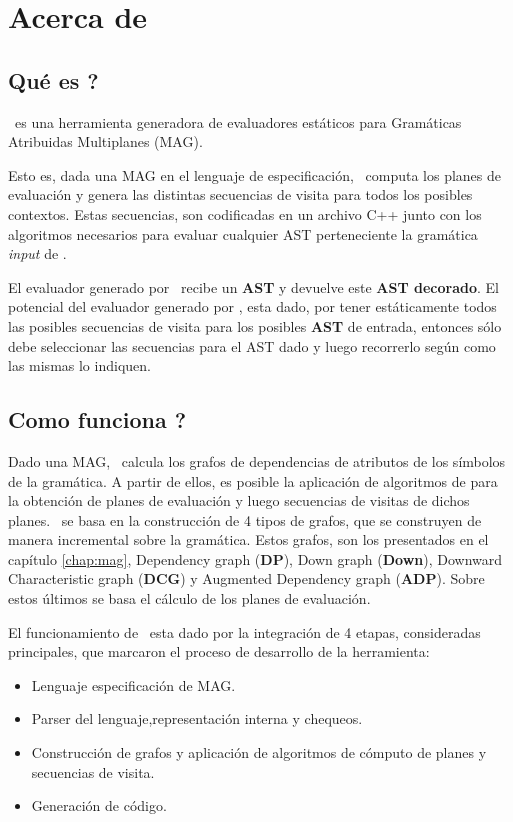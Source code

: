 \chapter{Acerca de \maggen}
\label{chap:acercamaggen}
\minitoc

\section{\textquestiondown Qué es \maggen?}
\maggen\ es una herramienta generadora de evaluadores estáticos para Gramáticas Atribuidas Multiplanes (MAG). 

Esto es, dada una MAG en el lenguaje de especificación, \maggen\ computa los planes de evaluación y genera las distintas secuencias de visita para todos los posibles contextos. Estas secuencias, son codificadas en un archivo C++ junto con los algoritmos necesarios para evaluar cualquier AST perteneciente la gramática \textit{input} de \maggen.

El evaluador generado por \maggen\ recibe un \textbf{AST} y devuelve este \textbf{AST decorado}. El potencial del evaluador generado por \maggen, esta dado, por tener estáticamente todos las posibles secuencias de visita para los posibles \textbf{AST} de entrada, entonces sólo debe seleccionar las secuencias para el AST dado y luego recorrerlo según como las mismas lo indiquen.

\section{\textquestiondown Como funciona \maggen ?}
Dado una MAG, \maggen\ calcula los grafos de dependencias de atributos de los símbolos de la gramática. A partir de ellos, es posible la aplicación de algoritmos de para la obtención de planes de evaluación y luego secuencias de visitas de dichos planes. \maggen\ se basa en la construcción de 4 tipos de grafos, que se construyen de manera incremental sobre la gramática. Estos grafos, son los presentados en el capítulo \ref{chap:mag}, Dependency graph (\textbf{DP}), Down graph (\textbf{Down}), Downward Characteristic graph (\textbf{DCG}) y Augmented Dependency graph (\textbf{ADP}). Sobre estos últimos se basa el cálculo de los planes de evaluación.

El funcionamiento de \maggen\ esta dado por la integración de 4 etapas, consideradas principales, que marcaron el proceso de desarrollo de la herramienta:
\begin{itemize}
\item Lenguaje especificación de MAG.
\item Parser del lenguaje,representación interna y chequeos.
\item Construcción de grafos y aplicación de algoritmos de cómputo de planes y secuencias de visita.
\item Generación de código.
\end{itemize}

